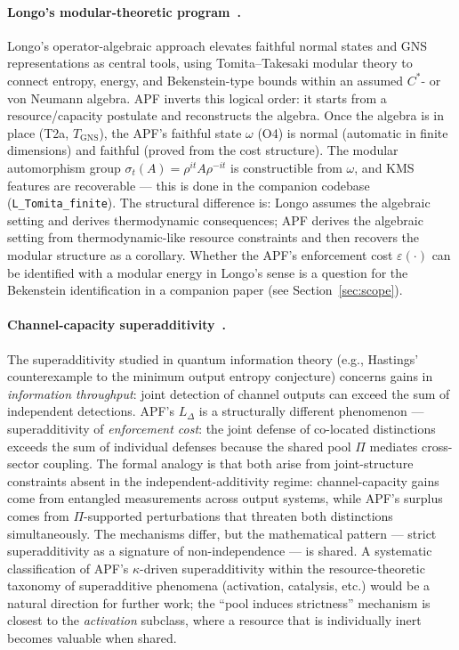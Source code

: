 \documentclass[11pt,a4paper]{article}
\theoremstyle{definition}
\newcommand{\eps}{\varepsilon}
\begin{document}
\paragraph{Longo's modular-theoretic program~\cite{BratteliRobinson1987}.}
Longo's operator-algebraic approach elevates faithful normal states and GNS representations as central tools, using Tomita--Takesaki modular theory to connect entropy, energy, and Bekenstein-type bounds within an assumed $C^*$- or von Neumann algebra.  APF inverts this logical order: it starts from a resource/capacity postulate and reconstructs the algebra.  Once the algebra is in place (T2a, $T_{\mathrm{GNS}}$), the APF's faithful state $\omega$ (O4) is normal (automatic in finite dimensions) and faithful (proved from the cost structure).  The modular automorphism group $\sigma_t(A) = \rho^{it}A\rho^{-it}$ is constructible from $\omega$, and KMS features are recoverable --- this is done in the companion codebase (\texttt{L\_Tomita\_finite}).  The structural difference is: Longo assumes the algebraic setting and derives thermodynamic consequences; APF derives the algebraic setting from thermodynamic-like resource constraints and then recovers the modular structure as a corollary.  Whether the APF's enforcement cost $\eps(\cdot)$ can be identified with a modular energy in Longo's sense is a question for the Bekenstein identification in a companion paper (see Section~\ref{sec:scope}).

\paragraph{Channel-capacity superadditivity~\cite{Cirelson1980}.}
The superadditivity studied in quantum information theory (e.g., Hastings' counterexample to the minimum output entropy conjecture) concerns gains in \emph{information throughput}: joint detection of channel outputs can exceed the sum of independent detections.  APF's $L_\Delta$ is a structurally different phenomenon --- superadditivity of \emph{enforcement cost}: the joint defense of co-located distinctions exceeds the sum of individual defenses because the shared pool $\Pi$ mediates cross-sector coupling.  The formal analogy is that both arise from joint-structure constraints absent in the independent-additivity regime: channel-capacity gains come from entangled measurements across output systems, while APF's surplus comes from $\Pi$-supported perturbations that threaten both distinctions simultaneously.  The mechanisms differ, but the mathematical pattern --- strict superadditivity as a signature of non-independence --- is shared.  A systematic classification of APF's $\kappa$-driven superadditivity within the resource-theoretic taxonomy of superadditive phenomena (activation, catalysis, etc.) would be a natural direction for further work; the ``pool induces strictness'' mechanism is closest to the \emph{activation} subclass, where a resource that is individually inert becomes valuable when shared.
\end{document}
